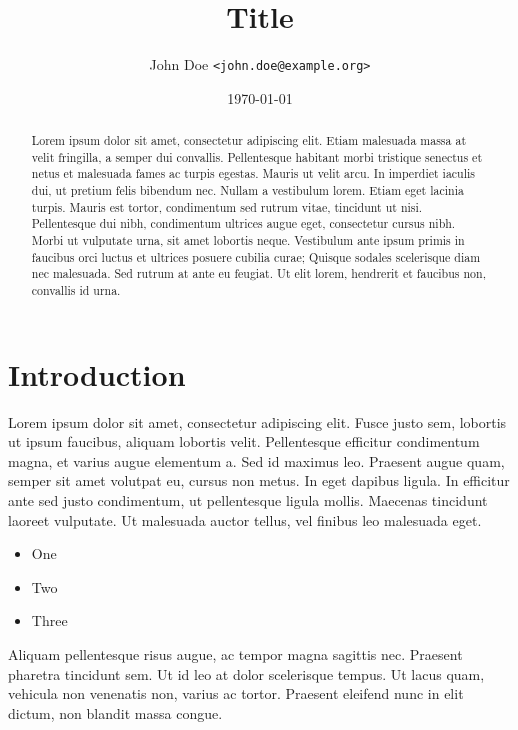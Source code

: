 \documentclass[10pt,a4paper,twoside,twocolumn]{article}
\title{Title}
\author{John Doe \texttt{<john.doe@example.org>}}
\date{\today}
\begin{document}
\maketitle

\begin{abstract}

Lorem ipsum dolor\cite{JS2015} sit amet, consectetur adipiscing\cite{rfc2119} elit. Etiam malesuada massa at velit fringilla, a semper dui convallis. Pellentesque habitant morbi tristique senectus et netus et malesuada fames ac turpis egestas. Mauris ut velit arcu. In imperdiet iaculis dui, ut pretium felis bibendum nec. Nullam a vestibulum lorem. Etiam eget lacinia turpis. Mauris est tortor, condimentum sed rutrum vitae, tincidunt ut nisi. Pellentesque dui nibh, condimentum ultrices augue eget, consectetur cursus nibh. Morbi ut vulputate urna, sit amet lobortis neque. Vestibulum ante ipsum primis in faucibus orci luctus et ultrices posuere cubilia curae; Quisque sodales scelerisque diam nec malesuada. Sed rutrum at ante eu feugiat. Ut elit lorem, hendrerit et faucibus non, convallis id urna.

\end{abstract}

\section{Introduction}

Lorem ipsum dolor sit amet, consectetur adipiscing elit. Fusce justo sem, lobortis ut ipsum faucibus, aliquam lobortis velit. Pellentesque efficitur condimentum magna, et varius augue elementum a. Sed id maximus leo. Praesent augue quam, semper sit amet volutpat eu, cursus non metus. In eget dapibus ligula. In efficitur ante sed justo condimentum, ut pellentesque ligula mollis. Maecenas tincidunt laoreet vulputate. Ut malesuada auctor tellus, vel finibus leo malesuada eget.

\begin{itemize}
  \item One
  \item Two
  \item Three
\end{itemize}

Aliquam pellentesque risus augue, ac tempor magna sagittis nec. Praesent pharetra tincidunt sem. Ut id leo at dolor scelerisque tempus. Ut lacus quam, vehicula non venenatis non, varius ac tortor. Praesent eleifend nunc in elit dictum, non blandit massa congue.
\end{document}
